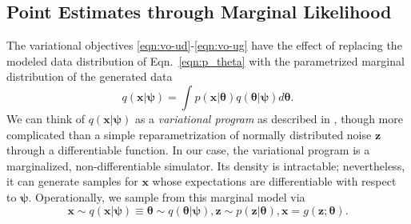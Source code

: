 \documentclass[twocolumn,superscriptaddress,aps]{revtex4-1}
\newcommand{\qxpsi}{q(\mathbf{x}|\bfpsi)}
\newcommand{\bftheta}{{\bm \theta}}
\newcommand{\bfpsi}{{\bm \psi}}
\newcommand{\bfx}{\mathbf{x}}
\newcommand{\bfz}{\mathbf{z}}
\theoremstyle{plain}
\begin{document}
\subsection{Point Estimates through Marginal Likelihood}


The variational objectives \ref{eqn:vo-ud}-\ref{eqn:vo-ug}
have the effect of replacing the modeled data distribution of Eqn.~\ref{eqn:p_theta} with
the parametrized marginal distribution of the generated data
\begin{equation}\label{eq:marginal_likelihood}
    \qxpsi = \int  p(\mathbf{x}|\bftheta) q(\bftheta|\bfpsi) d\bftheta.
\end{equation}
We can think of $q(\bfx|\bfpsi)$ as a \textit{variational program} as described
in \citep{2016arXiv161009033R}, though more complicated than a simple
reparametrization of normally distributed noise $\bfz$ through a differentiable
function. In our case, the variational program is a
marginalized, non-differentiable  simulator.  Its density is  intractable;
nevertheless, it can generate samples for $\bfx$ whose expectations are differentiable with
respect to $\bfpsi$.
Operationally, we sample from this marginal model via
\begin{equation}\label{eqn:p_psi}
    \mathbf{x} \sim \qxpsi \equiv \bftheta \sim q(\bftheta|\bfpsi), \bfz \sim p(\bfz|\bftheta), \mathbf{x} = g(\bfz; \bftheta).
\end{equation}


\end{document}
